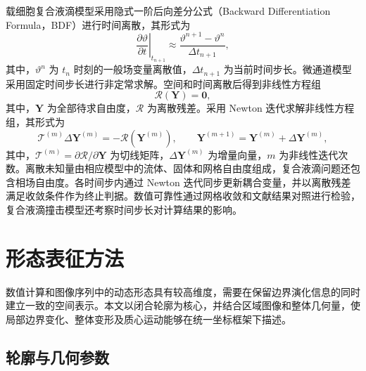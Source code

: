 载细胞复合液滴模型采用隐式一阶后向差分公式（Backward Differentiation Formula，BDF）进行时间离散\cite{ascher1998computer}，其形式为
\begin{equation}
\left.
\frac{\partial\vartheta}{\partial t}
\right|_{t_{n+1}}
\approx
\frac{\vartheta^{n+1}-\vartheta^n}{\Delta t_{n+1}},
\label{eq:ch2_bdf_first_order}
\end{equation}
其中，$\vartheta^n$ 为 $t_n$ 时刻的一般场变量离散值，$\Delta t_{n+1}$ 为当前时间步长。微通道模型采用固定时间步长进行非定常求解。空间和时间离散后得到非线性方程组
\begin{equation}
\boldsymbol{\mathcal{R}}(\boldsymbol{Y})
=
\boldsymbol{0},
\label{eq:ch2_discrete_residual}
\end{equation}
其中，$\boldsymbol{Y}$ 为全部待求自由度，$\boldsymbol{\mathcal{R}}$ 为离散残差。采用 Newton 迭代求解非线性方程组\cite{ypma1995historical}，其形式为
\begin{equation}
\boldsymbol{\mathcal{T}}^{(m)}
\Delta\boldsymbol{Y}^{(m)}
=
-\boldsymbol{\mathcal{R}}\!\left(\boldsymbol{Y}^{(m)}\right),
\qquad
\boldsymbol{Y}^{(m+1)}
=
\boldsymbol{Y}^{(m)}
+
\Delta\boldsymbol{Y}^{(m)},
\label{eq:ch2_newton_iteration}
\end{equation}
其中，$\boldsymbol{\mathcal{T}}^{(m)}=\partial\boldsymbol{\mathcal{R}}/\partial\boldsymbol{Y}$ 为切线矩阵，$\Delta\boldsymbol{Y}^{(m)}$ 为增量向量，$m$ 为非线性迭代次数。离散未知量由相应模型中的流体、固体和网格自由度组成，复合液滴问题还包含相场自由度。各时间步内通过 Newton 迭代同步更新耦合变量，并以离散残差满足收敛条件作为终止判据。数值可靠性通过网格收敛和文献结果对照进行检验，复合液滴撞击模型还考察时间步长对计算结果的影响。

\section{形态表征方法}
\label{sec:ch2_morphology}

数值计算和图像序列中的动态形态具有较高维度，需要在保留边界演化信息的同时建立一致的空间表示。本文以闭合轮廓为核心，并结合区域图像和整体几何量，使局部边界变化、整体变形及质心运动能够在统一坐标框架下描述。

\subsection{轮廓与几何参数}
\label{subsec:ch2_geometry}

